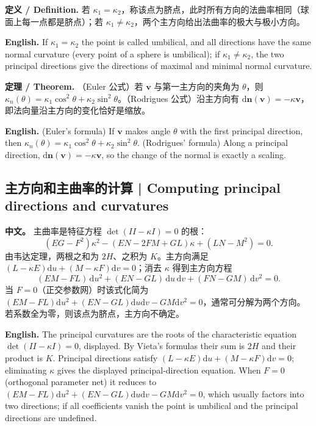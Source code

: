 \documentclass[UTF8,11pt,a4paper]{ctexart}
\newcommand{\APS}[2]{\par\noindent\textbf{中文。} #1\par\noindent\textbf{English.} #2\par\smallskip}
\newcommand{\EN}[1]{\par\noindent \textbf{English.} #1\par}
\newcommand{\DEF}[2]{\par\noindent\textbf{定义 / Definition.} #1\par\EN{#2}\par\smallskip}
\newcommand{\THM}[2]{\par\noindent\textbf{定理 / Theorem.} #1\par\EN{#2}\par\smallskip}
\newcommand{\dd}{\mathrm{d}}
\newcommand{\bn}{\mathbf{n}}
\newcommand{\bv}{\mathbf{v}}
\begin{document}
\DEF{若 $\kappa_1=\kappa_2$，称该点为脐点，此时所有方向的法曲率相同（球面上每一点都是脐点）；若 $\kappa_1\ne\kappa_2$，两个主方向给出法曲率的极大与极小方向。}{If $\kappa_1=\kappa_2$ the point is called umbilical, and all directions have the same normal curvature (every point of a sphere is umbilical); if $\kappa_1\ne\kappa_2$, the two principal directions give the directions of maximal and minimal normal curvature.}
\THM{（Euler 公式）若 $\bv$ 与第一主方向的夹角为 $\theta$，则 $\kappa_n(\theta)=\kappa_1\cos^2\theta+\kappa_2\sin^2\theta$。（Rodrigues 公式）沿主方向有 $\dd\bn(\bv)=-\kappa\bv$，即法向量沿主方向的变化恰好是缩放。}{(Euler's formula) If $\bv$ makes angle $\theta$ with the first principal direction, then $\kappa_n(\theta)=\kappa_1\cos^2\theta+\kappa_2\sin^2\theta$. (Rodrigues' formula) Along a principal direction, $\dd\bn(\bv)=-\kappa\bv$, so the change of the normal is exactly a scaling.}

\subsection{主方向和主曲率的计算 | Computing principal directions and curvatures}
\APS{主曲率是特征方程 $\det(II-\kappa I)=0$ 的根：
\[
(EG-F^2)\kappa^2-(EN-2FM+GL)\kappa+(LN-M^2)=0 .
\]
由韦达定理，两根之和为 $2H$、之积为 $K$。主方向满足 $(L-\kappa E)\dd u+(M-\kappa F)\dd v=0$；消去 $\kappa$ 得到主方向方程
\[
(EM-FL)\,\dd u^2+(EN-GL)\,\dd u\,\dd v+(FN-GM)\,\dd v^2=0 .
\]
当 $F=0$（正交参数网）时该式化简为 $(EM-FL)\dd u^2+(EN-GL)\dd u\dd v-GM\dd v^2=0$，通常可分解为两个方向。若系数全为零，则该点为脐点，主方向不确定。}{The principal curvatures are the roots of the characteristic equation $\det(II-\kappa I)=0$, displayed. By Vieta's formulas their sum is $2H$ and their product is $K$. Principal directions satisfy $(L-\kappa E)\dd u+(M-\kappa F)\dd v=0$; eliminating $\kappa$ gives the displayed principal-direction equation. When $F=0$ (orthogonal parameter net) it reduces to $(EM-FL)\dd u^2+(EN-GL)\dd u\dd v-GM\dd v^2=0$, which usually factors into two directions; if all coefficients vanish the point is umbilical and the principal directions are undefined.}
\end{document}
